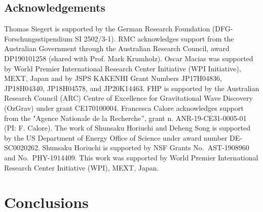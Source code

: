 \documentclass[doublespace,nopageskip]{VTthesis}
\begin{document}



%




\section*{Acknowledgements}
%
Thomas Siegert is supported by the German Research Foundation (DFG-Forschungsstipendium SI 2502/3-1).
%
RMC acknowledges 
support from the Australian Government through the Australian Research Council, award
DP190101258 (shared with Prof. Mark Krumholz).
%
Oscar Macias was supported by World Premier International Research Center Initiative (WPI Initiative), MEXT, Japan and by JSPS KAKENHI Grant Numbers JP17H04836, JP18H04340, JP18H04578, and JP20K14463.
% 
FHP is supported by the Australian Research  Council  (ARC)  Centre  of  Excellence for  Gravitational  Wave  Discovery (OzGrav)  under grant CE170100004.
%
Francesca Calore acknowledges 
support from the "Agence Nationale de la Recherche”, grant n. ANR-19-CE31-0005-01 (PI: F. Calore).
%
The work of Shunsaku Horiuchi and Deheng Song is supported by the US Department of Energy Office of Science under award number DE-SC0020262.
%
Shunsaku Horiuchi is supported by NSF Grants No.~AST-1908960 and No.~PHY-1914409. This work was supported by World Premier International Research Center Initiative (WPI), MEXT, Japan. 


\chapter{Conclusions} \label{ch:summary}
\end{document}
